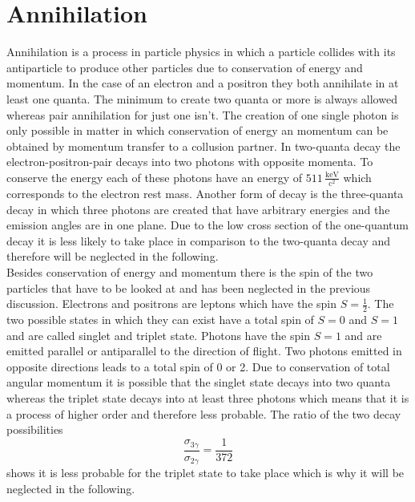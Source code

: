 \section{Annihilation}
Annihilation is a process in particle physics in which a particle collides with its antiparticle to produce other particles due to conservation of energy and momentum. In the case of an electron and a positron they both annihilate in at least one quanta. The minimum to create two quanta or more is always allowed whereas pair annihilation for just one isn't. The creation of one single photon is only possible in matter in which conservation of energy an momentum can be obtained by momentum transfer to a collusion partner. In two-quanta decay the electron-positron-pair decays into two photons with opposite momenta. To conserve the energy each of these photons have an energy of $511\,\frac{\text{keV}}{\text{c}^2}$ which corresponds to the electron rest mass. Another form of decay is the three-quanta decay in which three photons are created that have arbitrary energies and the emission angles are in one plane. Due to the low cross section of the one-quantum decay it is less likely to take place in comparison to the two-quanta decay and therefore will be neglected in the following. \\
Besides conservation of energy and momentum there is the spin of the two particles that have to be looked at and has been neglected in the previous discussion. Electrons and positrons are leptons which have the spin $S=\frac{1}{2}$. The two possible states in which they can exist have a total spin of $S=0$ and $S=1$ and are called singlet and triplet state. Photons have the spin $S=1$ and are emitted parallel or antiparallel to the direction of flight. Two photons emitted in opposite directions leads to a total spin of 0 or 2. Due to conservation of total angular momentum it is possible that the singlet state decays into two quanta whereas the triplet state decays into at least three photons which means that it is a process of higher order and therefore less probable. The ratio of the two decay possibilities
\begin{equation}
    \frac{\sigma_{3\gamma}}{\sigma_{2\gamma}}=\frac{1}{372}
    \label{ration decay}
\end{equation} shows it is less probable for the triplet state to take place which is why it will be neglected in the following.



